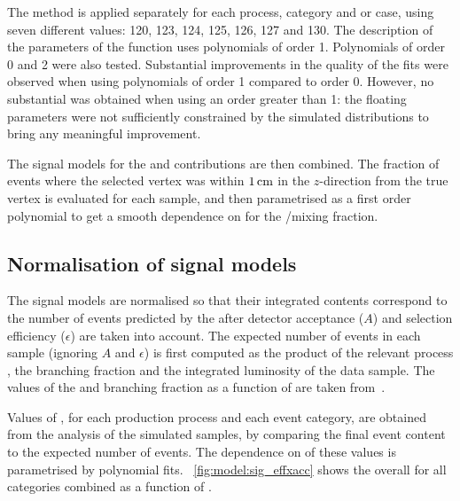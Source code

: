 The \SSF method is applied separately for each process, category and \RV or \WV case, using seven different \mH values: 120, 123, 124, 125, 126, 127 and 130\GeV. The description of the parameters of the \DCBpG function uses polynomials of order 1. Polynomials of order 0 and 2 were also tested. Substantial improvements in the quality of the fits were observed when using polynomials of order 1 compared to order 0. However, no substantial was obtained when using an order greater than 1: the floating parameters were not sufficiently constrained by the simulated \mgg distributions to bring any meaningful improvement.

The signal models for the \RV and \WV contributions are then combined. %
The fraction of events where the selected vertex was within $1\,\text{cm}$ in the $z$-direction from the true vertex is evaluated for each \mH sample, and then parametrised as a first order polynomial to get a smooth dependence on \mH for the \RV/\WV mixing fraction.


\subsection{Normalisation of signal models}
\label{model:sec:signal_model_normalisation}

The signal models are normalised so that their integrated contents correspond to the number of events predicted by the \SM after detector acceptance ($A$) and selection efficiency ($\epsilon$) are taken into account. The expected number of events in each sample (ignoring $A$ and $\epsilon$) is first computed as the product of the relevant process \crosssection, the \Hgg branching fraction and the integrated luminosity of the data sample. The values of the \crosssection\s and branching fraction as a function of \mH are taken from~\cite{LHCHXSWGYR4}.


Values of \effxacc, for each production process and each event category, are obtained from the analysis of the simulated samples, by comparing the final event content to the expected number of events.
The dependence on \mH of these values is parametrised by polynomial fits.
\Fig~\ref{fig:model:sig_effxacc} shows the overall \effxacc for all categories combined as a function of \mH.


